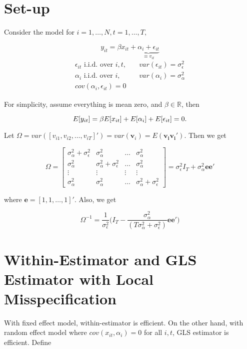 \documentclass[12pt]{article}
\begin{document}
\section*{Set-up}

Consider the model for $i=1, \ldots, N, t=1, \ldots, T,$

\[
y_{it} = \beta x_{it} + \underbrace{\alpha_i + \epsilon_{it}}_{\equiv v_{it}}
\]
\begin{align*}
\epsilon_{it}\,\, \text{i.i.d. over $i, t$}, \quad & var(\epsilon_{it})=\sigma_\epsilon^2\\
\alpha_i \,\, \text{i.i.d. over $i$},\quad & var(\alpha_i) = \sigma_\alpha^2 \\
cov(\alpha_i, \epsilon_{it}) = 0 
\end{align*}

For simplicity, assume everything is mean zero, and $\beta \in \mathbb{R}$, then

\[
E[y_{it}]=\beta E[x_{it}] + E[\alpha_i] + E[\epsilon_{it}] = 0.\\
\]

Let $\Omega =var([v_{i1}, v_{i2}, \ldots, v_{iT}]') = var(\mathbf{v}_i) = E(\mathbf{v_i}\mathbf{v_i}')$. Then we get 

\[
\Omega = \begin{bmatrix}
\sigma_\alpha^2 + \sigma_\epsilon^2  & \sigma_\alpha^2 & \ldots & \sigma_\alpha^2\\ 
\sigma_\alpha^2 & \sigma_\alpha^2 + \sigma_\epsilon^2 & \ldots & \sigma_\alpha^2\\ 
\vdots & \vdots & \vdots& \vdots\\ 
\sigma_\alpha^2 & \sigma_\alpha^2 & \ldots & \sigma_\alpha^2 + \sigma_\epsilon^2
\end{bmatrix}
= \sigma_\epsilon^2 I_T + \sigma_\alpha^2 \mathbf{ee'}
\]

where $\mathbf{e}= [1, 1, \ldots, 1]'$. Also, we get

\[
\Omega^{-1} = \frac{1}{\sigma_\epsilon^2} \bigg( I_T - \frac{\sigma_\alpha^2}{(T\sigma_\alpha^2 + \sigma_\epsilon^2)} \mathbf{ee'}   \bigg)
\]

\vspace{0.2in}

\section*{Within-Estimator and GLS Estimator with Local Misspecification}

With fixed effect model, within-estimator is efficient. On the other hand, with random effect model where $cov(x_{it}, \alpha_i)=0$ for all $i, t$, GLS estimator is efficient. Define
\end{document}
